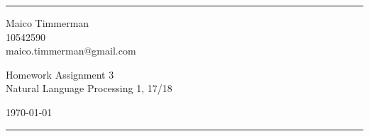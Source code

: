 \documentclass[a4paper]{article}
\begin{document}

\fancyhead[C]{}
\hrule \medskip %
\begin{minipage}{0.295\textwidth}
    \raggedright
    \footnotesize
    Maico Timmerman \hfill\\
    10542590\hfill\\
    maico.timmerman@gmail.com
\end{minipage}
\begin{minipage}{0.4\textwidth}
    \centering
    \large
    Homework Assignment 3\\
    \normalsize
    Natural Language Processing 1, 17/18\\
\end{minipage}
\begin{minipage}{0.295\textwidth}
    \raggedleft
    \today\hfill\\
\end{minipage}
\medskip\hrule
\bigskip


\newcommand{\CCG}[3][]{
\begin{tabular}[t]{@{\hspace{-3pt}}c@{\hspace{-3pt}}}
#2\\[-7pt]
\leavevmode \leaders \hrule \hskip 0pt plus 1filll \kern 0pt %
    \raisebox{-2.5pt}{\footnotesize{#1}}\\
    \begin{tabular}[t]{@{}c@{}}
        \textit{#3}
    \end{tabular}
\end{tabular}
}
\end{document}
